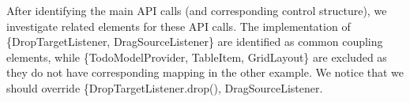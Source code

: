 After identifying the main API calls (and corresponding control structure), we investigate related elements for these API calls. The implementation of \{DropTargetListener, DragSourceListener\} are identified as common coupling elements, while \{TodoModelProvider, TableItem, GridLayout\} are excluded as they do not have corresponding mapping in the other example. We notice that we should override \{DropTargetListener.drop(), DragSourceListener. 



